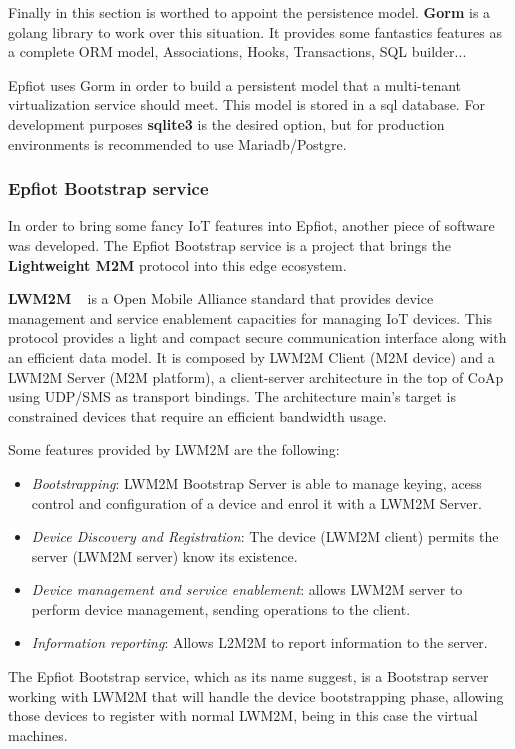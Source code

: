 Finally in this section is worthed to appoint the persistence model.
\textbf{Gorm} is a golang library to work over this situation. It provides some fantastics features as a complete ORM model, Associations, Hooks, Transactions, SQL builder...

Epfiot uses Gorm in order to build a persistent model that a multi-tenant virtualization service should meet. This model is stored in a sql database. For development purposes \textbf{sqlite3} is the desired option, but for production environments is recommended to use Mariadb/Postgre.

\subsubsection{Epfiot Bootstrap service}

In order to bring some fancy IoT features into Epfiot, another piece of software was developed. The Epfiot Bootstrap service is a project that brings the \textbf{Lightweight M2M} protocol into this edge ecosystem.

\textbf{LWM2M} ~\cite{lwm2m_paper} is a Open Mobile Alliance standard that provides device management and service enablement capacities for managing IoT devices.
This protocol provides a light and compact secure communication interface along with an efficient data model. It is composed by LWM2M Client (M2M device) and a LWM2M Server (M2M platform), a client-server architecture in the top of CoAp using UDP/SMS as transport bindings. The architecture main's target is constrained devices that require an efficient bandwidth usage. ~\cite{IEE:lwm2m:2015}

Some features provided by LWM2M are the following:
\begin{itemize}
\item \textit{Bootstrapping}: LWM2M Bootstrap Server is able to manage keying, acess control and configuration of a device and enrol it with a LWM2M Server.
\item \textit{Device Discovery and Registration}: The device (LWM2M client) permits the server (LWM2M server) know its existence.
\item \textit{Device management and service enablement}: allows LWM2M server to perform device management, sending operations to the client.
\item \textit{Information reporting}: Allows L2M2M to report information to the server.
\end{itemize}

The Epfiot Bootstrap service, which as its name suggest, is a Bootstrap server working with LWM2M that will handle the device bootstrapping phase, allowing those devices to register with normal LWM2M, being in this case the virtual machines.

